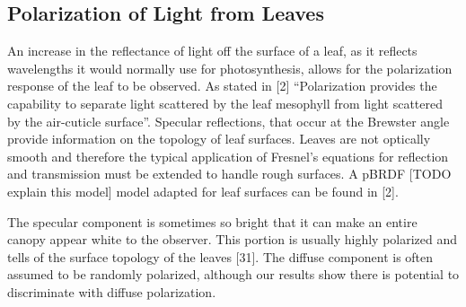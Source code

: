 \subsection{Polarization of Light from Leaves}

An increase in the reflectance of light off the surface of a leaf, as it reflects wavelengths it would normally use for photosynthesis, allows for the polarization response of the leaf to be observed.  As stated in [2] “Polarization provides the capability to separate light scattered by the leaf mesophyll from light scattered by the air-cuticle surface”.  Specular reflections, that occur at the Brewster angle provide information on the topology of leaf surfaces.  Leaves are not optically smooth and therefore the typical application of Fresnel’s equations for reflection and transmission must be extended to handle rough surfaces. A pBRDF [TODO explain this model] model adapted for leaf surfaces can be found in [2].

The specular component is sometimes so bright that it can make an entire canopy appear white to the observer.  This portion is usually highly polarized and tells of the surface topology of the leaves [31].  The diffuse component is often assumed to be randomly polarized, although our results show there is potential to discriminate with diffuse polarization.

